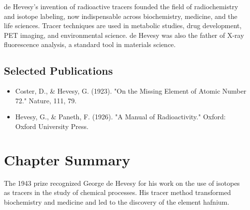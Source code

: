 de Hevesy's invention of radioactive tracers founded the field of radiochemistry and isotope labeling, now indispensable across biochemistry, medicine, and the life sciences. Tracer techniques are used in metabolic studies, drug development, PET imaging, and environmental science. de Hevesy was also the father of X-ray fluorescence analysis, a standard tool in materials science.

\subsection*{Selected Publications}

\begin{itemize}

\item Coster, D., \& Hevesy, G. (1923). "On the Missing Element of Atomic Number 72." Nature, 111, 79.

\item Hevesy, G., \& Paneth, F. (1926). "A Manual of Radioactivity." Oxford: Oxford University Press.

\end{itemize}

\clearpage

\section*{Chapter Summary}

The 1943 prize recognized George de Hevesy for his work on the use of isotopes as tracers in the study of chemical processes. His tracer method transformed biochemistry and medicine and led to the discovery of the element hafnium.
